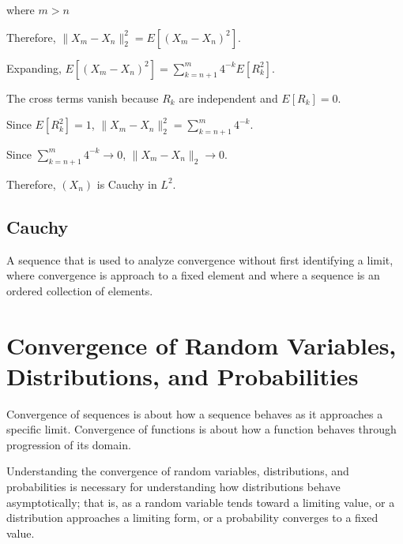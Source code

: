 \documentclass{article}
\begin{document}
where $m>n$

\vspace{1\baselineskip}

Therefore, $\|X_m-X_n\|_2^2=E[(X_m-X_n)^2]$.

\vspace{1\baselineskip}

Expanding, $E[(X_m-X_n)^2]=\sum_{k=n+1}^{m}4^{-k}E[R_k^2]$.

\vspace{1\baselineskip}

The cross terms vanish because $R_k$ are independent and $E[R_k]=0$.

\vspace{1\baselineskip}

Since $E[R_k^2]=1$, $\|X_m-X_n\|_2^2=\sum_{k=n+1}^{m}4^{-k}$.

\vspace{1\baselineskip}

Since $\sum_{k=n+1}^{m}4^{-k}\to0$, $\|X_m-X_n\|_2\to0$.

\vspace{1\baselineskip}

Therefore, $(X_n)$ is Cauchy in $L^2$.

\subsection{Cauchy}
A sequence that is used to analyze convergence without first identifying a limit, where convergence is approach to a fixed element and where a sequence is an ordered collection of elements.

\newpage
\section{Convergence of Random Variables, Distributions, and Probabilities}
Convergence of sequences is about how a sequence behaves as it approaches a specific limit. Convergence of functions is about how a function behaves through progression of its domain. 

Understanding the convergence of random variables, distributions, and probabilities is necessary for understanding how distributions behave asymptotically; that is, as a random variable tends toward a limiting value, or a distribution approaches a limiting form, or a probability converges to a fixed value.
\end{document}
